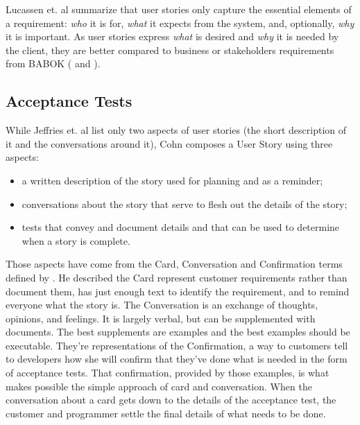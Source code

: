 
Lucassen et. al \cite{Lucassen_2015} summarize that user stories only capture the essential elements of a requirement: \textit{who} it is for, \textit{what} it expects from the system, and, optionally, \textit{why} it is important. As user stories express \textit{what} is desired and \textit{why} it is needed by the client, they are better compared to business or stakeholders requirements from BABOK (\cite{Babok_2009} and \cite{Babok_2015}).

\subsection{Acceptance Tests}

While Jeffries et. al \cite{Jeffries_2000} list only two aspects of user stories (the short description of it and the conversations around it), Cohn \cite{Cohn_2004} composes a User Story using three aspects:

\begin{itemize}
    \item a written description of the story used for planning and as a reminder;
    \item conversations about the story that serve to flesh out the details of the story;
    \item tests that convey and document details and that can be used to determine when a story is complete.
\end{itemize}

Those aspects have come from the Card, Conversation and Confirmation terms defined by \cite{Jeffries_2001}. He described the Card represent customer requirements rather than document them, has just enough text to identify the requirement, and to remind everyone what the story is. The Conversation is an exchange of thoughts, opinions, and feelings. It is largely verbal, but can be supplemented with documents. The best supplements are examples and the best examples should be executable. They're representations of the Confirmation, a way to customers tell to developers how she will confirm that they've done what is needed in the form of acceptance tests. That confirmation, provided by those examples, is what makes possible the simple approach of card and conversation. When the conversation about a card gets down to the details of the acceptance test, the customer and programmer settle the final details of what needs to be done.

